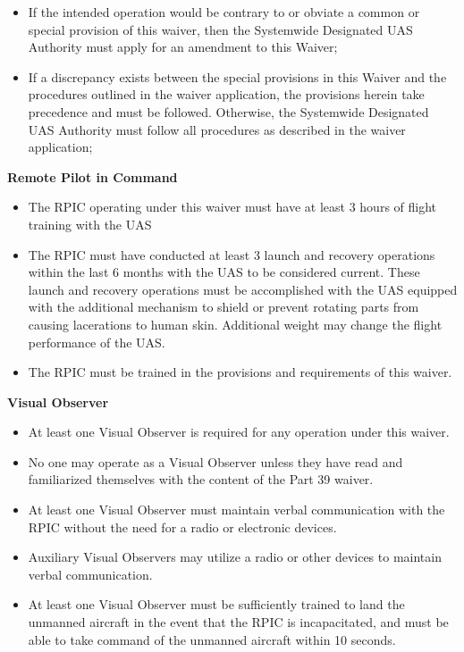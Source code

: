 \documentclass[
]{book}
\providecommand{\tightlist}{%
  \setlength{\itemsep}{0pt}\setlength{\parskip}{0pt}}
\begin{document}
\begin{itemize}
\item
  If the intended operation would be contrary to or obviate a common or special provision of this waiver, then the Systemwide Designated UAS Authority must apply for an amendment to this Waiver;
\item
  If a discrepancy exists between the special provisions in this Waiver and the procedures outlined in the waiver application, the provisions herein take precedence and must be followed. Otherwise, the Systemwide Designated UAS Authority must follow all procedures as described in the waiver application;
\end{itemize}

\textbf{Remote Pilot in Command}

\begin{itemize}
\tightlist
\item
  The RPIC operating under this waiver must have at least 3 hours of flight training with the UAS
\item
  The RPIC must have conducted at least 3 launch and recovery operations within the last 6 months with the UAS to be considered current. These launch and recovery operations must be accomplished with the UAS equipped with the additional mechanism to shield or prevent rotating parts from causing lacerations to human skin. Additional weight may change the flight performance of the UAS.
\item
  The RPIC must be trained in the provisions and requirements of this waiver.
\end{itemize}

\textbf{Visual Observer}

\begin{itemize}
\tightlist
\item
  At least one Visual Observer is required for any operation under this waiver.
\item
  No one may operate as a Visual Observer unless they have read and familiarized themselves with the content of the Part 39 waiver.
\item
  At least one Visual Observer must maintain verbal communication with the RPIC without the need for a radio or electronic devices.
\item
  Auxiliary Visual Observers may utilize a radio or other devices to maintain verbal communication.
\item
  At least one Visual Observer must be sufficiently trained to land the unmanned aircraft in the event that the RPIC is incapacitated, and must be able to take command of the unmanned aircraft within 10 seconds.
\end{itemize}
\end{document}
